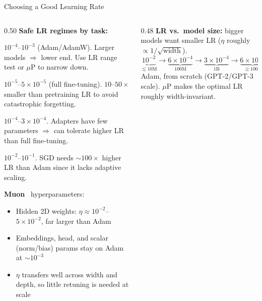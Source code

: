\begin{frame}{Choosing a Good Learning Rate}

  \begin{columns}[T]
    \begin{column}{0.50\textwidth}
      \textbf{Safe LR regimes by task:}
      \begin{description}[labelwidth=\widthof{\bfseries From scratch~~}, leftmargin=!]
        \item[From scratch] $10^{-4}$--$10^{-3}$ (Adam/AdamW). Larger models $\Rightarrow$ lower end. Use LR range test or $\mu$P to narrow down.
        \item[Fine-tune] $10^{-5}$--$5 \times 10^{-5}$ (full fine-tuning). $10\text{--}50\times$ smaller than pretraining LR to avoid catastrophic forgetting.
        \item[LoRA/PEFT] $10^{-4}$--$3 \times 10^{-4}$. Adapters have few parameters $\Rightarrow$ can tolerate higher LR than full fine-tuning.
        \item[SGD (vision)] $10^{-2}$--$10^{-1}$. SGD needs $\sim$$100\times$ higher LR than Adam since it lacks adaptive scaling.
      \end{description}

      \medskip
      \textbf{Muon}~\cite{jordan2024muon} hyperparameters:
      \begin{itemize}
        \item Hidden 2D weights: $\eta \approx 10^{-2}$--$5{\times}10^{-2}$, far larger than Adam
        \item Embeddings, head, and scalar (norm/bias) params stay on Adam at $\sim$$10^{-3}$
        \item $\eta$ transfers well across width and depth, so little retuning is needed at scale
      \end{itemize}
    \end{column}
    \begin{column}{0.48\textwidth}
      \textbf{LR vs.\ model size:} bigger models want smaller LR ($\eta$ roughly $\propto 1/\sqrt{\text{width}}$).
      \[
        \underbrace{10^{-2}}_{\lesssim 10\text{M}} \to
        \underbrace{6{\times}10^{-4}}_{100\text{M}} \to
        \underbrace{3{\times}10^{-4}}_{1\text{B}} \to
        \underbrace{6{\times}10^{-5}}_{\gtrsim 100\text{B}}
      \]
      {\scriptsize Adam, from scratch (GPT-2/GPT-3 scale). $\mu$P makes the optimal LR roughly width-invariant.}


\end{column}
\end{columns}
\end{frame}
